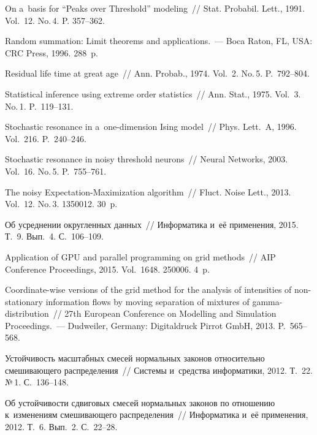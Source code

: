 \begin{multicols}{2}
{{\begin{thebibliography}{99}
  
On a~basis for ``Peaks over Threshold'' modeling~// Stat. Probabil. Lett., 
1991. Vol.~12. No.\,4. P. 357--362.

  Random summation: Limit 
theorems and applications.~--- Boca Raton, FL, USA: CRC Press, 1996. 288~p.

  
Residual life time at great age~// Ann. Probab., 1974. Vol.~2. No.\,5. P.~792--804.

  Statistical inference
 using extreme order statistics~// Ann. Stat., 1975. Vol.~3. No.\,1. P.~119--131.

  Stochastic resonance 
in a~one-dimension Ising model~// Phys. Lett.~A, 1996. Vol.~216. P.~240--246.

  Stochastic resonance 
in noisy threshold neurons~// Neural Networks, 2003. Vol.~16. No.\,5. P.~755--761.

  The noisy 
Expectation-Maximization algorithm~// Fluct. Noise Lett., 2013. Vol.~12. No.\,3. 1350012. 30~p.

  Об усреднении округленных
 данных~// Информатика и~её применения, 2015. Т.~9. Вып.~4. С.~106--109.

  Application of GPU and parallel programming on grid methods~// 
AIP Conference Proceedings, 2015. Vol.~1648. 250006. 4~p.

Coordinate-wise versions of the grid method for the analysis of intensities of 
non-stationary information flows by moving separation of mixtures of 
gamma-distribution~// 27th European Conference on Modelling and Simulation
Proceedings.~--- Dudweiler, Germany: Digitaldruck Pirrot GmbH, 2013. P.~565--568.


 Устойчивость масштабных 
смесей нормальных законов относительно смешивающего распределения~// 
Системы и~средства информатики, 2012. Т.~22. №\,1. С.~136--148.

 Об устойчивости сдвиговых 
смесей нормальных законов по отношению к~изменениям смешивающего распределения~// 
Информатика и~её применения, 2012. Т.~6. Вып.~2. С.~22--28.


\end{thebibliography}}}
\end{multicols}
